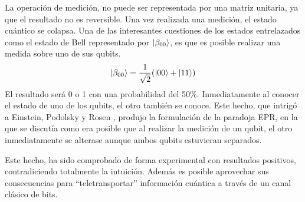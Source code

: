 La operación de medición, no puede ser representada por una matriz unitaria, ya 
que el resultado no es reversible. Una vez realizada una medición, el estado 
cuántico se colapsa. Una de las interesantes cuestiones de los estados 
entrelazados como el estado de Bell representado por $\ket{\beta_{00}}$, es que 
es posible realizar una medida sobre uno de sus qubits.
%
$$ \ket{\beta_{00}} = \frac{1}{\sqrt{2}}(\ket{00} + \ket{11}) $$
%
El resultado será 0 o 1 con una probabilidad del 50\%. Inmediatamente al conocer 
el estado de uno de los qubits, el otro también se conoce. Este hecho, que 
intrigó a Einstein, Podolsky y Rosen \cite{EPR}, produjo la formulación de la 
paradoja EPR, en la que se discutía como era posible que al realizar la medición 
de un qubit, el otro inmediatamente se alterase aunque ambos qubits estuvieran 
separados.

Este hecho, ha sido comprobado de forma experimental con resultados positivos, 
contradiciendo totalmente la intuición. Además es posible aprovechar sus 
consecuencias para ``teletransportar'' información cuántica a través de un canal 
clásico de bits.

